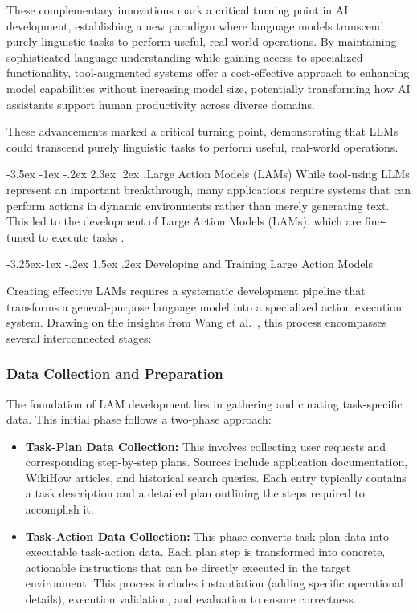 \documentclass[journal,twoside,10pt]{IEEEtran}
\makeatletter
\renewcommand\section{\@startsection{section}{1}{\z@}%
                       {-3.5ex \@plus -1ex \@minus -.2ex}%
                       {2.3ex \@plus.2ex}%
                       {\normalfont\Large\bfseries\Roman{section}.\quad}}
\renewcommand\subsection{\@startsection{subsection}{2}{\z@}%
                       {-3.25ex\@plus -1ex \@minus -.2ex}%
                       {1.5ex \@plus .2ex}%
                       {\normalfont\large\bfseries}}
\makeatother
\begin{document}
These complementary innovations mark a critical turning point in AI development, establishing a new paradigm where language models transcend purely linguistic tasks to perform useful, real-world operations. By maintaining sophisticated language understanding while gaining access to specialized functionality, tool-augmented systems offer a cost-effective approach to enhancing model capabilities without increasing model size, potentially transforming how AI assistants support human productivity across diverse domains.

These advancements marked a critical turning point, demonstrating that LLMs could transcend purely linguistic tasks to perform useful, real-world operations.

\section{Large Action Models (LAMs)}
While tool-using LLMs represent an important breakthrough, many applications require systems that can perform actions in dynamic environments rather than merely generating text. This led to the development of Large Action Models (LAMs), which are fine-tuned to execute tasks \cite{wang2023lam}.

\subsection{Developing and Training Large Action Models}

Creating effective LAMs requires a systematic development pipeline that transforms a general-purpose language model into a specialized action execution system. Drawing on the insights from Wang et al.~\cite{wang2023lam}, this process encompasses several interconnected stages:

\subsubsection{Data Collection and Preparation}
The foundation of LAM development lies in gathering and curating task-specific data. This initial phase follows a two-phase approach:

\begin{itemize}
    \item \textbf{Task-Plan Data Collection:} This involves collecting user requests and corresponding step-by-step plans. Sources include application documentation, WikiHow articles, and historical search queries. Each entry typically contains a task description and a detailed plan outlining the steps required to accomplish it.
    
    \item \textbf{Task-Action Data Collection:} This phase converts task-plan data into executable task-action data. Each plan step is transformed into concrete, actionable instructions that can be directly executed in the target environment. This process includes instantiation (adding specific operational details), execution validation, and evaluation to ensure correctness.
\end{itemize}
\end{document}
